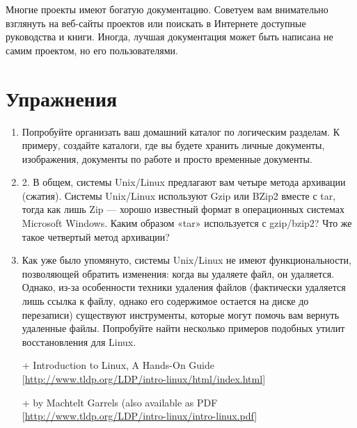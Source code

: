 \documentclass[12pt]{book}
\begin{document}
Многие проекты имеют богатую документацию. Советуем вам внимательно взглянуть на веб-сайты проектов или поискать в Интернете доступные руководства и книги. Иногда, лучшая документация может быть написана не самим проектом, но его пользователями.

\newpage
{\color{white}\section{Упражнения}}
\begin{tcolorbox}[title=\textbf{Упражнения}, colback=yellow!14!white, colframe=red!75!white]
\begin{enumerate}
	\item Попробуйте организать ваш домашний каталог по логическим разделам. К примеру, создайте каталоги, где вы будете хранить личные документы, изображения, документы по работе и просто временные документы. 
	\item 2. В общем, системы Unix/Linux предлагают вам четыре метода архивации (сжатия). Системы Unix/Linux используют Gzip или BZip2 вместе с tar, тогда как лишь Zip — хорошо известный формат в операционных системах Microsoft Windows. Каким образом «tar» используется с gzip/bzip2? Что же такое четвертый метод архивации?
	\item Как уже было упомянуто, системы Unix/Linux не имеют функциональности, позволяющей обратить изменения: когда вы удаляете файл, он удаляется. Однако, из-за особенности техники удаления файлов (фактически удаляется лишь ссылка к файлу, однако его содержимое остается на диске до перезаписи) существуют инструменты, которые могут помочь вам вернуть удаленные файлы. Попробуйте найти несколько примеров подобных утилит восстановления для Linux.
\end{enumerate}
\end{tcolorbox}

\phantom{}
\begin{tcolorbox}[title=\textbf{Дальнейшие ресурсы}, colback=yellow!14!white, colframe=red!75!blue]
\begin{itemize}
	\item[+] Introduction to Linux, A Hands-On Guide [\href{http://www.tldp.org/LDP/intro-linux/html/index.html}{http://www.tldp.org/LDP/intro-linux/html/index.html}]
	\item[+] by Machtelt Garrels (also available as PDF [\href{http://www.tldp.org/LDP/intro-linux/intro-linux.pdf}{http://www.tldp.org/LDP/intro-linux/intro-linux.pdf}]
\end{itemize}
\end{tcolorbox}
\end{document}

